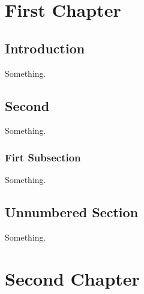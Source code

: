 \documentclass{book}
\begin{document}
\chapter{First Chapter}

\section{Introduction}

Something.

\section{Second}

Something.

\subsection{Firt Subsection}

Something.

\section*{Unnumbered Section}

Something.

\chapter{Second Chapter}
\end{document}
